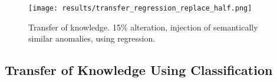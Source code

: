\begin{comment}
\begin{figure*}[ht!]
\centering
  \captionsetup{justification=centering}
   \subfloat[Bert\label{fig:roc_curve_bert_transfer_regression}]{%
      \texttt{[image: results/transfer/roc\_curve\_transfer\_regression\_bert\_0.15.png]}}
\hspace{\fill}
   \subfloat[GPT-2\label{fig:roc_curve_gpt_transfer_regression} ]{%
      \texttt{[image: results/transfer/roc\_curve\_transfer\_regression\_gpt\_0.15.png]}}
\hspace{\fill}
   \subfloat[XL\label{fig:roc_curve_xl_transfer_regression}]{%
      \texttt{[image: results/transfer/roc\_curve\_transfer\_regression\_xl\_0.15.png]}}\\
\caption{\label{fig:results_transfer_regression_roc}ROC-Curve for transfer of knowledge using regression with 15\% alterations.}
\end{figure*}
\end{comment}

\begin{figure}[H]
  \centering
  \captionsetup{justification=centering}
  \texttt{[image: results/transfer\_regression\_replace\_half.png]}\\
  \caption{Transfer of knowledge. 15\% alteration, injection of semantically similar anomalies, using regression.}
  \label{fig:replace_words_regression_transfer}
\end{figure}

\subsection{Transfer of Knowledge Using Classification \label{sec:results-classification-transfer}}

